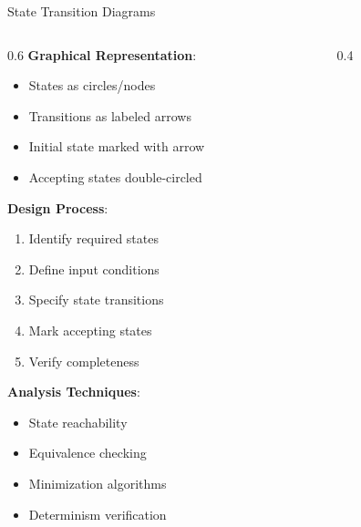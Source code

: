 \documentclass[aspectratio=169,11pt]{beamer}
\newcommand{\concept}[1]{\textbf{\color{accentcolor}#1}}
\begin{document}
\begin{frame}{State Transition Diagrams}
\begin{columns}
\begin{column}{0.6\textwidth}
\concept{Graphical Representation}:
\begin{itemize}
\item States as circles/nodes
\item Transitions as labeled arrows
\item Initial state marked with arrow
\item Accepting states double-circled
\end{itemize}
\vspace{0.3cm}
\concept{Design Process}:
\begin{enumerate}
\item Identify required states
\item Define input conditions
\item Specify state transitions
\item Mark accepting states
\item Verify completeness
\end{enumerate}
\vspace{0.3cm}
\concept{Analysis Techniques}:
\begin{itemize}
\item State reachability
\item Equivalence checking
\item Minimization algorithms
\item Determinism verification
\end{itemize}
\end{column}
\begin{column}{0.4\textwidth}
\begin{center}

\end{center}
\end{column}
\end{columns}
\end{frame}
\end{document}
